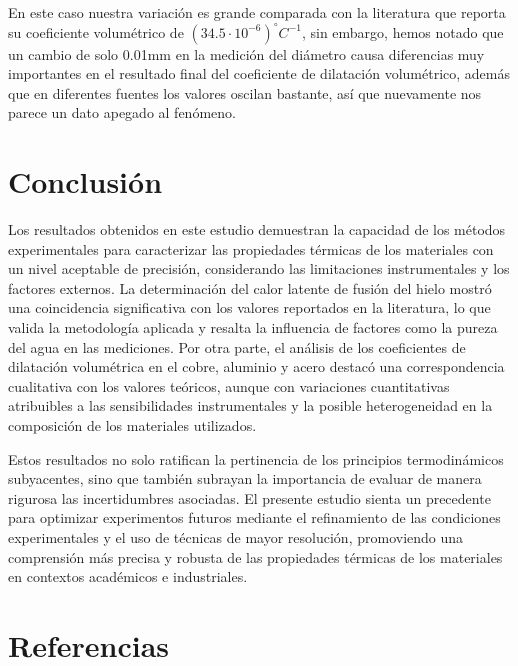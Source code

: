 \documentclass{article}
\begin{document}
En este caso nuestra variación es grande comparada con la literatura que reporta su coeficiente volumétrico de $(34.5 \cdot 10^{-6})^{\circ}C^{-1}$, sin embargo, hemos notado que un cambio de solo 0.01mm en la medición del diámetro causa diferencias muy importantes en el resultado final del coeficiente de dilatación volumétrico, además que en diferentes fuentes los valores oscilan bastante, así que nuevamente nos parece un dato apegado al fenómeno.

\section{Conclusión}

Los resultados obtenidos en este estudio demuestran la capacidad de los métodos experimentales para caracterizar las propiedades térmicas de los materiales con un nivel aceptable de precisión, considerando las limitaciones instrumentales y los factores externos. La determinación del calor latente de fusión del hielo mostró una coincidencia significativa con los valores reportados en la literatura, lo que valida la metodología aplicada y resalta la influencia de factores como la pureza del agua en las mediciones. Por otra parte, el análisis de los coeficientes de dilatación volumétrica en el cobre, aluminio y acero destacó una correspondencia cualitativa con los valores teóricos, aunque con variaciones cuantitativas atribuibles a las sensibilidades instrumentales y la posible heterogeneidad en la composición de los materiales utilizados.

Estos resultados no solo ratifican la pertinencia de los principios termodinámicos subyacentes, sino que también subrayan la importancia de evaluar de manera rigurosa las incertidumbres asociadas. El presente estudio sienta un precedente para optimizar experimentos futuros mediante el refinamiento de las condiciones experimentales y el uso de técnicas de mayor resolución, promoviendo una comprensión más precisa y robusta de las propiedades térmicas de los materiales en contextos académicos e industriales.

\section{Referencias}

\nocite{*}


\end{document}
